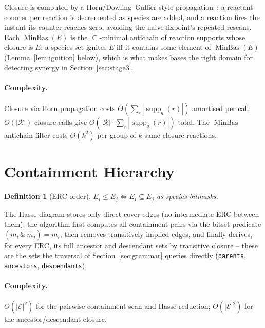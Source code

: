 \documentclass[11pt]{article}
\theoremstyle{plain}
\newtheorem{definition}{Definition}
\theoremstyle{remark}
\newcommand{\supp}{\operatorname{supp}}
\newcommand{\MinBas}{\operatorname{MinBas}}
\newcommand{\E}{\mathcal{E}}
\newcommand{\R}{\mathcal{R}}
\begin{document}
Closure is computed by a Horn/Dowling--Gallier-style
propagation~\cite{dowling1984linear}: a reactant counter per reaction is
decremented as species are added, and a reaction fires the instant its
counter reaches zero, avoiding the naive fixpoint's repeated rescans.
Each $\MinBas(E)$ is the $\subseteq$-minimal antichain of reaction
supports whose closure is $E$; a species set ignites $E$ iff it contains
some element of $\MinBas(E)$ (Lemma~\ref{lem:ignition} below), which is
what makes bases the right domain for detecting synergy in
Section~\ref{sec:stage3}.

\paragraph{Complexity.} Closure via Horn propagation costs
$O(\sum_r|\supp_q(r)|)$ amortised per call; $O(|\R|)$ closure calls give
$O(|\R|\cdot\sum_r|\supp_q(r)|)$ total. The $\MinBas$ antichain filter
costs $O(k^2)$ per group of $k$ same-closure reactions.

\section{Containment Hierarchy}\label{sec:stagehier}

\begin{definition}[ERC order]
$E_i \leq E_j \iff E_i \subseteq E_j$ as species bitmasks.
\end{definition}

The Hasse diagram stores only direct-cover edges (no intermediate ERC
between them); the algorithm first computes all containment pairs via the
bitset predicate $(m_i\,\&\,m_j) = m_i$, then removes transitively implied
edges, and finally derives, for every ERC, its full ancestor and
descendant sets by transitive closure -- these are the sets the traversal
of Section~\ref{sec:grammar} queries directly (\texttt{parents},
\texttt{ancestors}, \texttt{descendants}).

\paragraph{Complexity.} $O(|\E|^2)$ for the pairwise containment scan and
Hasse reduction; $O(|\E|^2)$ for the ancestor/descendant closure.

\end{document}
